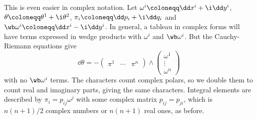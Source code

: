 \begin{example}
    This is even easier in complex notation. Let $\omega^i\coloneqq \dd x^i+\i \dd y^i$, $\theta\coloneqq \theta^1+\i \theta^2$, $\pi_i\coloneqq \dd p_i+\i \dd q_i$ and $\wb\omega^i\coloneqq \dd x^i-\i \dd y^i$. In general, a tableau in complex forms will have terms expressed in wedge products with $\omega^i$ and $\wb\omega^i$. But the Cauchy-Riemann equations give 
    \[\dd\theta=-\begin{pmatrix}
        \boxed{\pi^1} & \cdots &\boxed{\pi^n}
    \end{pmatrix}\wedge 
    \begin{pmatrix}
        \omega^1\\\vdots \\ \omega^n
    \end{pmatrix}\]
    with no $\wb\omega^i$ terms. The characters count complex polars, so we double them to count real and imaginary parts, giving the same characters. Integral elements are described by $\pi_i=p_{ij}\omega^j$ with some complex matrix $p_{ij}=p_{ji}$, which is $n(n+1)/2$ complex numbers or $n(n+1)$ real ones, as before.
\end{example}



